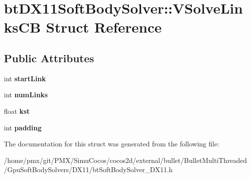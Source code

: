 \hypertarget{structbtDX11SoftBodySolver_1_1VSolveLinksCB}{}\section{bt\+D\+X11\+Soft\+Body\+Solver\+:\+:V\+Solve\+Links\+CB Struct Reference}
\label{structbtDX11SoftBodySolver_1_1VSolveLinksCB}
\subsection*{Public Attributes}
\begin{DoxyCompactItemize}
\item 
\mbox{\label{structbtDX11SoftBodySolver_1_1VSolveLinksCB_a21d973663fa1451678b1700535c4a2de}} 
int {\bfseries start\+Link}
\item 
\mbox{\label{structbtDX11SoftBodySolver_1_1VSolveLinksCB_a9c6264db55ce65f77fddf9e8074053e5}} 
int {\bfseries num\+Links}
\item 
\mbox{\label{structbtDX11SoftBodySolver_1_1VSolveLinksCB_a1ca2d1027a3f5df6ad35dd086300d727}} 
float {\bfseries kst}
\item 
\mbox{\label{structbtDX11SoftBodySolver_1_1VSolveLinksCB_a3ecd992522ddc030b3f12b7fe586f79e}} 
int {\bfseries padding}
\end{DoxyCompactItemize}


The documentation for this struct was generated from the following file\+:\begin{DoxyCompactItemize}
\item 
/home/pmx/git/\+P\+M\+X/\+Simu\+Cocos/cocos2d/external/bullet/\+Bullet\+Multi\+Threaded/\+Gpu\+Soft\+Body\+Solvers/\+D\+X11/bt\+Soft\+Body\+Solver\+\_\+\+D\+X11.\+h\end{DoxyCompactItemize}
